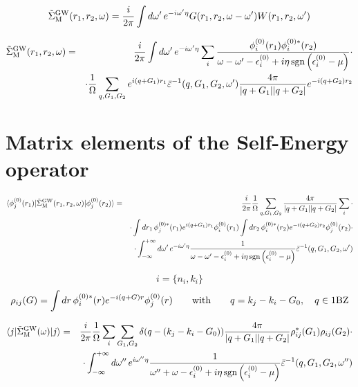 \documentclass[fleqn]{article}
\begin{document}
\[
  \tilde{\Sigma}^{\rm GW}_{\rm M}(r_1,r_2,\omega) =
  \frac{i}{2 \pi} \int d\omega' \, e^{-i \omega' \eta} 
  G(r_1,r_2,\omega-\omega')
  W(r_1,r_2,\omega')
\]

\begin{eqnarray*}
  \tilde{\Sigma}^{\rm GW}_{\rm M}(r_1,r_2,\omega) &=&
  \frac{i}{2 \pi} \int d\omega' \, e^{-i \omega' \eta} 
  \sum_i \frac{\phi^{(0)}_i(r_1) \phi^{(0)*}_i(r_2)}
  {\omega - \omega' - \epsilon^{(0)}_i + i \eta \mathrm{\, sgn} \left( \epsilon^{(0)}_i - \mu \right)} \cdot \\
  && \cdot \frac{1}{\Omega} \sum_{q,G_1,G_2}
  e^{i (q+G_1) r_1} \bar{\varepsilon}^{-1}(q,G_1,G_2,\omega')
  \frac{4\pi}{|q+G_1||q+G_2|} e^{-i (q+G_2) r_2} 
\end{eqnarray*}

\section{Matrix elements of the Self-Energy operator}

\begin{eqnarray*}
\langle \phi^{(0)}_j(r_1) | \tilde{\Sigma}^{\rm GW}_{\rm M}(r_1,r_2,\omega) | \phi^{(0)}_j(r_2) \rangle
&=&  \frac{i}{2 \pi} \frac{1}{\Omega} \sum_{q,G_1,G_2}
   \frac{4\pi}{|q+G_1||q+G_2|} \sum_i \cdot \\ && \cdot
  \int dr_1 \, \phi^{(0)*}_j(r_1) e^{i (q+G_1) r_1} \phi^{(0)}_i(r_1) 
  \int dr_2  \, \phi^{(0)*}_i(r_2) e^{-i (q+G_2) r_2} \phi^{(0)}_j(r_2) \cdot \\ && \cdot
  \int_{-\infty}^{+\infty} d\omega' \, e^{-i \omega' \eta} 
   \frac{1}{\omega - \omega' - \epsilon^{(0)}_i + i \eta \mathrm{\, sgn} \left( \epsilon^{(0)}_i - \mu \right)}
  \bar{\varepsilon}^{-1}(q,G_1,G_2,\omega')  
\end{eqnarray*}

\[
i = \{n_i,k_i\}
\]
\[
\rho_{ij}(G) = \int dr  \, \phi^{(0)*}_i(r) e^{-i (q+G) r} \phi^{(0)}_j(r)
\qquad \textrm{with} \qquad q = k_j - k_i - G_0, \quad q \in {\rm 1BZ}
\]

\begin{eqnarray*}
\langle j | \tilde{\Sigma}^{\rm GW}_{\rm M}(\omega) | j \rangle
&=&  \frac{i}{2 \pi} \frac{1}{\Omega} \sum_i \sum_{G_1,G_2} \delta(q-(k_j - k_i - G_0))
   \frac{4\pi}{|q+G_1||q+G_2|}
  \rho^*_{ij}(G_1) \rho_{ij}(G_2)  \cdot \\ && \cdot
  \int_{-\infty}^{+\infty} d\omega'' \, e^{i \omega'' \eta} 
   \frac{1}{\omega'' + \omega - \epsilon^{(0)}_i + i \eta \mathrm{\, sgn} \left( \epsilon^{(0)}_i - \mu \right)}
  \bar{\varepsilon}^{-1}(q,G_1,G_2,\omega'')  
\end{eqnarray*}
\end{document}
